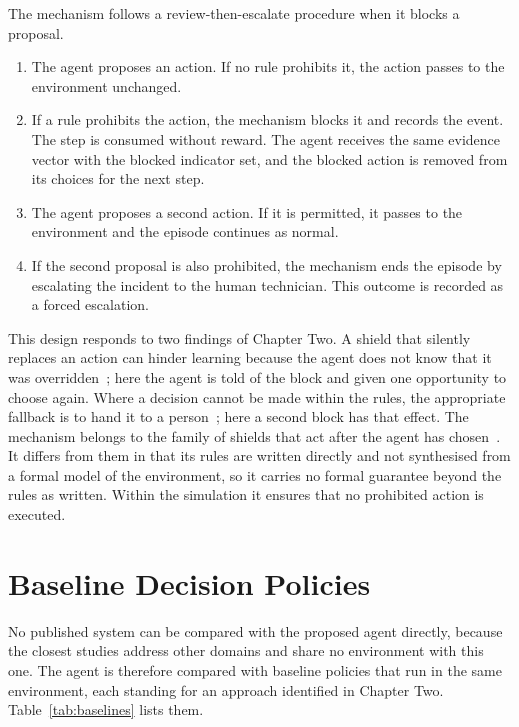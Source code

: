 \documentclass[12pt,a4paper]{article}
\begin{document}
The mechanism follows a review-then-escalate procedure when it blocks a proposal.

\begin{enumerate}
  \item The agent proposes an action. If no rule prohibits it, the action passes to the environment unchanged.
  \item If a rule prohibits the action, the mechanism blocks it and records the event. The step is consumed without reward. The agent receives the same evidence vector with the blocked indicator set, and the blocked action is removed from its choices for the next step.
  \item The agent proposes a second action. If it is permitted, it passes to the environment and the episode continues as normal.
  \item If the second proposal is also prohibited, the mechanism ends the episode by escalating the incident to the human technician. This outcome is recorded as a forced escalation.
\end{enumerate}

This design responds to two findings of Chapter Two. A shield that silently replaces an action can hinder learning because the agent does not know that it was overridden~\cite{yang2023}; here the agent is told of the block and given one opportunity to choose again. Where a decision cannot be made within the rules, the appropriate fallback is to hand it to a person~\cite{pacella2026}; here a second block has that effect. The mechanism belongs to the family of shields that act after the agent has chosen~\cite{alshiekh2018}. It differs from them in that its rules are written directly and not synthesised from a formal model of the environment, so it carries no formal guarantee beyond the rules as written. Within the simulation it ensures that no prohibited action is executed.

\section{Baseline Decision Policies}
\label{sec:baselines}

No published system can be compared with the proposed agent directly, because the closest studies address other domains and share no environment with this one. The agent is therefore compared with baseline policies that run in the same environment, each standing for an approach identified in Chapter Two. Table~\ref{tab:baselines} lists them.
\end{document}
